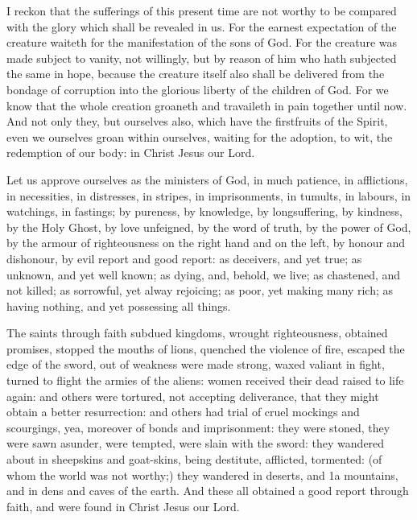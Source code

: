 \label{Romans818}
 I reckon that the sufferings of this present time are not worthy to be compared with the glory which shall be revealed in us. For the earnest expectation of the creature waiteth for the manifestation of the sons of God. For the creature was made subject to vanity, not willingly, but by reason of him who hath subjected the same in hope, because the creature itself also shall be delivered from the bondage of corruption into the glorious liberty of the children of God. For we know that the whole creation groaneth and travaileth in pain together until now. And not only they, but ourselves also, which have the firstfruits of the Spirit, even we ourselves groan within ourselves, waiting for the adoption, to wit, the redemption of our body: in Christ Jesus our Lord.

\label{2Corinthians64}
 Let us approve ourselves as the ministers of God, in much patience, in afflictions, in necessities, in distresses, in stripes, in imprisonments, in tumults, in labours, in watchings, in fastings; by pureness, by knowledge, by longsuffering, by kindness, by the Holy Ghost, by love unfeigned, by the word of truth, by the power of God, by the armour of righteousness on the right hand and on the left, by honour and dishonour, by evil report and good report: as deceivers, and yet true; as unknown, and yet well known; as dying, and, behold, we live; as chastened, and not killed; as sorrowful, yet alway rejoicing; as poor, yet making many rich; as having nothing, and yet possessing all things.

\label{Hebrews1133}
 The saints through faith subdued kingdoms, wrought righteousness, obtained promises, stopped the mouths of lions, quenched the violence of fire, escaped the edge of the sword, out of weakness were made strong, waxed valiant in fight, turned to flight the armies of the aliens: women received their dead raised to life again: and others were tortured, not accepting deliverance, that they might obtain a better resurrection: and others had trial of cruel mockings and scourgings, yea, moreover of bonds and imprisonment: they were stoned, they were sawn asunder, were tempted, were slain with the sword: they wandered about in sheepskins and goat-skins, being destitute, afflicted, tormented: (of whom the world was not worthy;) they wandered in deserts, and 1a mountains, and in dens and caves of the earth. And these all obtained a good report through faith, and were found in Christ Jesus our Lord.

